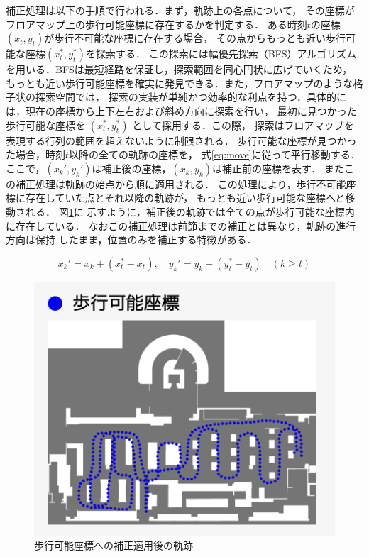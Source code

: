 補正処理は以下の手順で行われる．まず，軌跡上の各点について，
その座標がフロアマップ上の歩行可能座標に存在するかを判定する．
ある時刻$t$の座標$(x_t, y_t)$が歩行不可能な座標に存在する場合，
その点からもっとも近い歩行可能な座標$(x_t^*, y_t^*)$を探索する．
この探索には幅優先探索（BFS）アルゴリズムを用いる．BFSは最短経路を保証し，探索範囲を同心円状に広げていくため，
もっとも近い歩行可能座標を確実に発見できる．また，フロアマップのような格子状の探索空間では，
探索の実装が単純かつ効率的な利点を持つ．具体的には，現在の座標から上下左右および斜め方向に探索を行い，
最初に見つかった歩行可能な座標を $(x_t^*, y_t^*)$ として採用する．この際，
探索はフロアマップを表現する行列の範囲を超えないように制限される．
歩行可能な座標が見つかった場合，時刻$t$以降の全ての軌跡の座標を，
式\eqref{eq:move}に従って平行移動する．
ここで，$(x_k', y_k')$は補正後の座標，$(x_k, y_k)$は補正前の座標を表す．
またこの補正処理は軌跡の始点から順に適用される．%
この処理により，歩行不可能座標に存在していた点とそれ以降の軌跡が，
もっとも近い歩行可能な座標へと移動される．
図\ref{fig:walkable-points}に
示すように，補正後の軌跡では全ての点が歩行可能な座標内に存在している．
なおこの補正処理は前節までの補正とは異なり，軌跡の進行方向は保持
したまま，位置のみを補正する特徴がある．




\begin{equation}
  \label{eq:move}
x_k' = x_k + (x_t^* - x_t), \quad y_k' = y_k + (y_t^* - y_t) \quad (k \geq t)
\end{equation}


\begin{figure}[H]
    \centering
    \includegraphics[width=\linewidth]{../image/walkable-points.jpg}
    \caption{歩行可能座標への補正適用後の軌跡}    \label{fig:walkable-points}
\end{figure}
